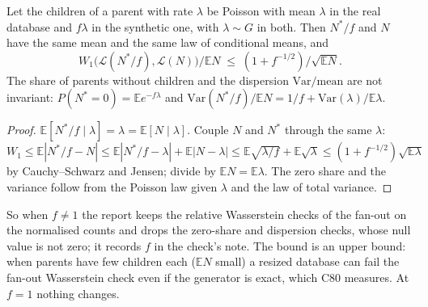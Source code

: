 \begin{proposition}\label{prop:ratenorm}
Let the children of a parent with rate $\lambda$ be Poisson with mean $\lambda$ in the real database and $f\lambda$ in the synthetic one, with $\lambda\sim G$ in both. Then $N^*/f$ and $N$ have the same mean and the same law of conditional means, and
\[ W_1\big(\mathcal{L}(N^*/f),\mathcal{L}(N)\big)\big/\mathbb{E}N \;\le\; (1+f^{-1/2})\big/\sqrt{\mathbb{E}N}. \]
The share of parents without children and the dispersion $\mathrm{Var}/\mathrm{mean}$ are not invariant: $P(N^*=0)=\mathbb{E}e^{-f\lambda}$ and $\mathrm{Var}(N^*/f)/\mathbb{E}N = 1/f+\mathrm{Var}(\lambda)/\mathbb{E}\lambda$.
\end{proposition}
\begin{proof}
$\mathbb{E}[N^*/f\mid\lambda]=\lambda=\mathbb{E}[N\mid\lambda]$. Couple $N$ and $N^*$ through the same $\lambda$: $W_1\le\mathbb{E}|N^*/f-N|\le\mathbb{E}|N^*/f-\lambda|+\mathbb{E}|N-\lambda|\le\mathbb{E}\sqrt{\lambda/f}+\mathbb{E}\sqrt{\lambda}\le(1+f^{-1/2})\sqrt{\mathbb{E}\lambda}$ by Cauchy--Schwarz and Jensen; divide by $\mathbb{E}N=\mathbb{E}\lambda$. The zero share and the variance follow from the Poisson law given $\lambda$ and the law of total variance.
\end{proof}
\noindent So when $f\neq1$ the report keeps the relative Wasserstein checks of the fan-out on the normalised counts and drops the zero-share and dispersion checks, whose null value is not zero; it records $f$ in the check's note. The bound is an upper bound: when parents have few children each ($\mathbb{E}N$ small) a resized database can fail the fan-out Wasserstein check even if the generator is exact, which C80 measures. At $f=1$ nothing changes.

